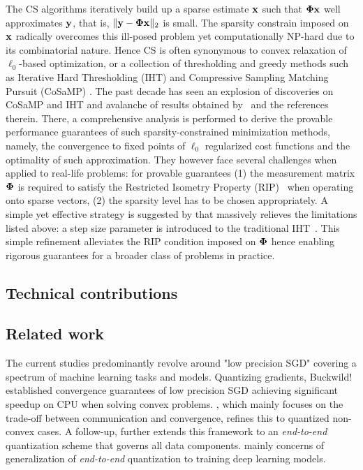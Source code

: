 \documentclass{article}
\begin{document}
The CS algorithms iteratively build up a sparse estimate ${\bf x}$ such that ${\bf \Phi}  {\bf x}$ well approximates ${\bf y}$, that is,  $\| {\bf y}- {\bf \Phi}  {\bf x} \|_2$ is small. The sparsity constrain imposed on ${\bf x}$ radically overcomes this ill-posed problem yet computationally NP-hard due to its combinatorial nature. Hence CS is often synonymous to convex relaxation of $\ell_0$-based optimization, or a collection of thresholding and greedy methods such as Iterative Hard Thresholding (IHT) \cite{blumensath2008iht, blumensath2009iht} and Compressive Sampling Matching Pursuit (CoSaMP) \cite{needel2008cosamp}. The past decade has seen an explosion of discoveries on CoSaMP and IHT and avalanche of results obtained by~\cite{liu2017dualiht, yuan2014ht, yuan2016htp, blumensath2013cs, needel2008cosamp} and the references therein. There, a comprehensive analysis is performed to derive the provable performance guarantees of such sparsity-constrained minimization methods, namely, the convergence to fixed points of $\ell_0$ regularized cost functions and the optimality of such approximation. They however face several challenges when applied to real-life problems: for provable guarantees (1) the measurement matrix ${\bf \Phi}$ is required to satisfy the Restricted Isometry Property (RIP)~\cite{candes2008rip, chartrand2008rip} when operating onto sparse vectors, (2) the sparsity level has to be chosen appropriately. A simple yet effective strategy is suggested by \cite{blumensath2010niht} that massively relieves the limitations listed above: a step size parameter is introduced to the traditional IHT~\cite{blumensath2008iht}. This simple refinement alleviates the RIP condition imposed on ${\bf \Phi}$ hence enabling rigorous guarantees for a broader class of problems in practice. 
\subsection{Technical contributions}
\subsection{Related work}
The current studies predominantly revolve around "low precision SGD" covering a spectrum of machine learning tasks and models. Quantizing gradients, Buckwild!~\cite{desa2015hogwild} established convergence guarantees of low precision SGD achieving significant speedup on CPU when solving convex problems. \cite{alistarh2016qsgd}, which mainly focuses on the trade-off between communication and convergence, refines this to quantized non-convex cases. A follow-up, \cite{zhang2017zipml} further extends this framework to an {\it end-to-end} quantization scheme that governs all data components. \cite{seide2014sgd1bit, hubara2016qsnn, rastegari2016binarycnn,zhou2016cnn, miyashita2016cnn, li2016twn, gupta2015dl} mainly concerns of generalization of {\it end-to-end} quantization to training deep learning models. 
\end{document}
